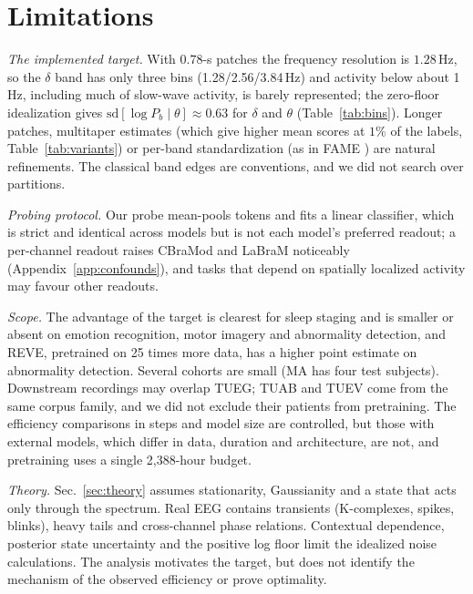 \section{Limitations}\label{sec:limits}
\noindent\emph{The implemented target.} With $0.78$-s patches the frequency resolution is
$1.28$\,Hz, so the $\delta$ band has only three bins (1.28/2.56/3.84\,Hz) and activity below
about 1\,Hz, including much of slow-wave activity, is barely represented; the zero-floor
idealization gives $\mathrm{sd}[\log P_b\mid\theta]\approx0.63$ for $\delta$ and $\theta$
(Table~\ref{tab:bins}). Longer patches, multitaper estimates (which give higher mean scores at $1\%$ of the labels,
Table~\ref{tab:variants}) or per-band standardization (as in FAME \cite{yu2026fame}) are
natural refinements. The classical band edges are conventions, and we did not search over
partitions.

\noindent\emph{Probing protocol.} Our probe mean-pools tokens and fits a linear classifier,
which is strict and identical across models but is not each model's preferred readout; a
per-channel readout raises CBraMod and LaBraM noticeably (Appendix~\ref{app:confounds}), and
tasks that depend on spatially localized activity may favour other readouts.

\noindent\emph{Scope.} The advantage of the target is clearest for sleep staging and is
smaller or absent on emotion recognition, motor imagery and abnormality detection, and REVE,
pretrained on 25 times more data, has a higher point estimate on abnormality detection. Several cohorts are small
(MA has four test subjects). Downstream recordings may overlap TUEG; TUAB and TUEV come from
the same corpus family, and we did not exclude their patients from pretraining. The efficiency comparisons in steps and
model size are controlled, but those with external models, which differ in data, duration and
architecture, are not, and pretraining uses a single 2{,}388-hour budget.

\noindent\emph{Theory.} Sec.~\ref{sec:theory} assumes stationarity, Gaussianity and a state
that acts only through the spectrum. Real EEG contains transients (K-complexes, spikes,
blinks), heavy tails and cross-channel phase relations. Contextual dependence, posterior state
uncertainty and the positive log floor limit the idealized noise calculations. The analysis
motivates the target, but does not identify the mechanism of the observed efficiency or prove optimality.
